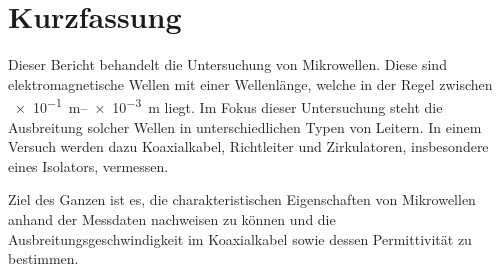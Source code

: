 \section{Kurzfassung}

	Dieser Bericht behandelt die Untersuchung von Mikrowellen.
	Diese sind elektromagnetische Wellen mit einer Wellenlänge, welche in der Regel zwischen \SIrange{e-1}{e-3}{\meter} liegt.
	Im Fokus dieser Untersuchung steht die Ausbreitung solcher Wellen in unterschiedlichen Typen von Leitern.
	In einem Versuch werden dazu Koaxialkabel, Richtleiter und Zirkulatoren, insbesondere eines Isolators, vermessen.
	
	Ziel des Ganzen ist es, die charakteristischen Eigenschaften von Mikrowellen anhand der Messdaten nachweisen zu können und die Ausbreitungsgeschwindigkeit im Koaxialkabel sowie dessen Permittivität zu bestimmen.